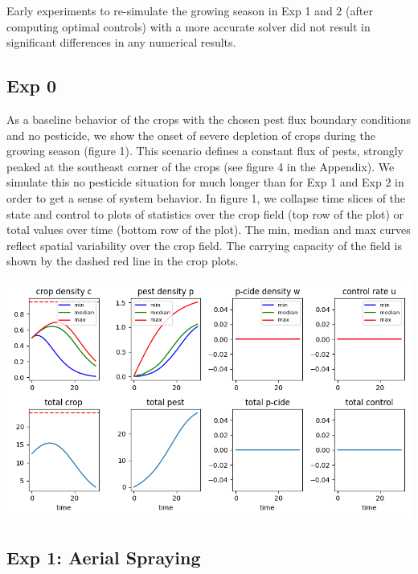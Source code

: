 \documentclass[11pt]{article}
\begin{document}
Early experiments to re-simulate the growing season in Exp 1 and 2 (after computing optimal controls) with a more accurate solver did not result in significant differences in any numerical results.

\subsection{Exp 0}

As a baseline behavior of the crops with the chosen pest flux boundary conditions and no pesticide, we show the onset of severe depletion of crops during the growing season (figure 1). This scenario defines a constant flux of pests, strongly peaked at the southeast corner of the crops (see figure 4 in the Appendix). We simulate this no pesticide situation for much longer than for Exp 1 and Exp 2 in order to get a sense of system behavior. In figure 1, we collapse time slices of the state and control to plots of statistics over the crop field (top row of the plot) or total values over time (bottom row of the plot). The min, median and max curves reflect spatial variability over the crop field. The carrying capacity of the field is shown by the dashed red line in the crop plots.

\begin{minipage}{\textwidth}
	\begin{center}
		\includegraphics[width=0.8\linewidth]{../sim_240604-091905/time.png}
	\end{center}
\end{minipage}

\subsection{Exp 1: Aerial Spraying}
\end{document}
